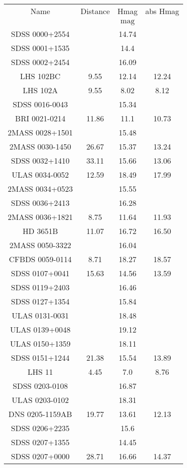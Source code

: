 \begin{table}
\begin{tabular}{cccc}
Name & Distance & Hmag & abs Hmag \\
 &  & $\mathrm{mag}$ &  \\
SDSS 0000+2554 &  & 14.74 &  \\
SDSS 0001+1535 &  & 14.4 &  \\
SDSS 0002+2454 &  & 16.09 &  \\
LHS 102BC & 9.55 & 12.14 & 12.24 \\
LHS 102A & 9.55 & 8.02 & 8.12 \\
SDSS 0016-0043 &  & 15.34 &  \\
BRI 0021-0214 & 11.86 & 11.1 & 10.73 \\
2MASS 0028+1501 &  & 15.48 &  \\
2MASS 0030-1450 & 26.67 & 15.37 & 13.24 \\
SDSS 0032+1410 & 33.11 & 15.66 & 13.06 \\
ULAS 0034-0052 & 12.59 & 18.49 & 17.99 \\
2MASS 0034+0523 &  & 15.55 &  \\
SDSS 0036+2413 &  & 16.28 &  \\
2MASS 0036+1821 & 8.75 & 11.64 & 11.93 \\
HD 3651B & 11.07 & 16.72 & 16.50 \\
2MASS 0050-3322 &  & 16.04 &  \\
CFBDS 0059-0114 & 8.71 & 18.27 & 18.57 \\
SDSS 0107+0041 & 15.63 & 14.56 & 13.59 \\
SDSS 0119+2403 &  & 16.46 &  \\
SDSS 0127+1354 &  & 15.84 &  \\
ULAS 0131-0031 &  & 18.48 &  \\
ULAS 0139+0048 &  & 19.12 &  \\
ULAS 0150+1359 &  & 18.11 &  \\
SDSS 0151+1244 & 21.38 & 15.54 & 13.89 \\
LHS 11 & 4.45 & 7.0 & 8.76 \\
SDSS 0203-0108 &  & 16.87 &  \\
ULAS 0203-0102 &  & 18.31 &  \\
DNS 0205-1159AB & 19.77 & 13.61 & 12.13 \\
SDSS 0206+2235 &  & 15.6 &  \\
SDSS 0207+1355 &  & 14.45 &  \\
SDSS 0207+0000 & 28.71 & 16.66 & 14.37 \\

\end{tabular}
\end{table}
